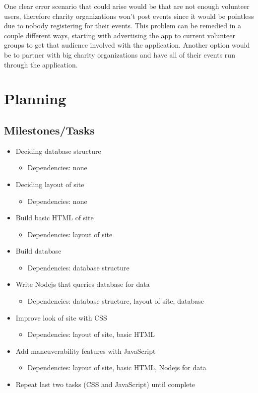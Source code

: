 \documentclass[12pt]{article}
\begin{document}
One clear error scenario that could arise would be that are not enough volunteer users,
therefore charity organizations won't post events since it would be pointless due to
nobody registering for their events. This problem can be remedied in a couple different
ways, starting with advertising the app to current volunteer groups to get that audience
involved with the application. Another option would be to partner with big charity
organizations and have all of their events run through the application.
\section{Planning}
\subsection{Milestones/Tasks}
\begin{itemize}
\item
	Deciding database structure
	\begin{itemize}
	\item
		Dependencies: none
	\end{itemize}
\item
	Deciding layout of site
	\begin{itemize}
	\item
		Dependencies: none
	\end{itemize}
\item
	Build basic HTML of site
	\begin{itemize}
	\item
		Dependencies: layout of site
	\end{itemize}
\item
	Build database
	\begin{itemize}
	\item
		Dependencies: database structure
	\end{itemize}
\item
	Write Nodejs that queries database for data
	\begin{itemize}
	\item
		Dependencies: database structure, layout of site, database
	\end{itemize}
\item
	Improve look of site with CSS
	\begin{itemize}
	\item
		Dependencies: layout of site, basic HTML
	\end{itemize}
\item
	Add maneuverability features with JavaScript
	\begin{itemize}
	\item
		Dependencies: layout of site, basic HTML, Nodejs for data
	\end{itemize}
\item
	Repeat last two tasks (CSS and JavaScript) until complete
\end{itemize}
\end{document}
